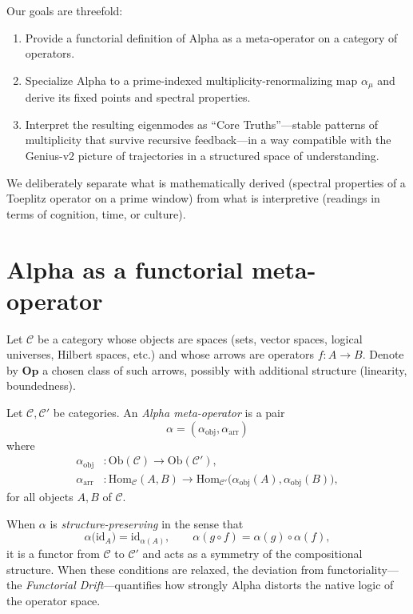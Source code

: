 \documentclass[11pt]{article}
\begin{document}
Our goals are threefold:
\begin{enumerate}[label=(\roman*)]
    \item Provide a functorial definition of Alpha as a meta-operator on a category of operators.
    \item Specialize Alpha to a prime-indexed multiplicity-renormalizing map $\alpha_\mu$ and derive its fixed points and spectral properties.
    \item Interpret the resulting eigenmodes as ``Core Truths''---stable patterns of multiplicity that survive recursive feedback---in a way compatible with the Genius-v2 picture of trajectories in a structured space of understanding.
\end{enumerate}

We deliberately separate what is mathematically derived (spectral properties of a Toeplitz operator on a prime window) from what is interpretive (readings in terms of cognition, time, or culture).


\section{Alpha as a functorial meta-operator}

Let $\mathcal{C}$ be a category whose objects are spaces (sets, vector spaces, logical universes, Hilbert spaces, etc.) and whose arrows are operators $f : A \to B$.
Denote by $\mathbf{Op}$ a chosen class of such arrows, possibly with additional structure (linearity, boundedness).

\begin{definition}
Let $\mathcal{C},\mathcal{C}'$ be categories.
An \emph{Alpha meta-operator} is a pair
\[
    \alpha = (\alpha_{\mathrm{obj}},\alpha_{\mathrm{arr}})
\]
where
\begin{align*}
    \alpha_{\mathrm{obj}} &: \mathrm{Ob}(\mathcal{C}) \to \mathrm{Ob}(\mathcal{C}'), \\
    \alpha_{\mathrm{arr}} &: \mathrm{Hom}_{\mathcal{C}}(A,B) \to \mathrm{Hom}_{\mathcal{C}'}\big(\alpha_{\mathrm{obj}}(A),\alpha_{\mathrm{obj}}(B)\big),
\end{align*}
for all objects $A,B$ of $\mathcal{C}$.
\end{definition}

When $\alpha$ is \emph{structure-preserving} in the sense that
\begin{equation}
\alpha\big(\mathrm{id}_A\big) = \mathrm{id}_{\alpha(A)}, \qquad
\alpha(g \circ f) = \alpha(g) \circ \alpha(f),
\end{equation}
it is a functor from $\mathcal{C}$ to $\mathcal{C}'$ and acts as a symmetry of the compositional structure.
When these conditions are relaxed, the deviation from functoriality---the \emph{Functorial Drift}---quantifies how strongly Alpha distorts the native logic of the operator space.
\end{document}
